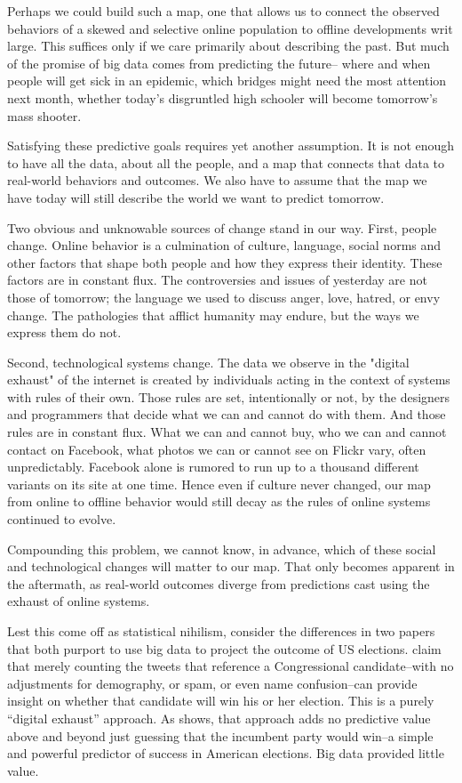 \documentclass[12pt]{article}
\begin{document}
Perhaps we could build such a map, one that allows us to connect the
observed behaviors of a skewed and selective online population to
offline developments writ large. This suffices only if we care
primarily about describing the past. But much of the promise of big
data comes from predicting the future-- where and when people will get
sick in an epidemic, which bridges might need the most attention next
month, whether today's disgruntled high schooler will become
tomorrow's mass shooter.

Satisfying these predictive goals requires yet another assumption. It
is not enough to have all the data, about all the people, and a map
that connects that data to real-world behaviors and outcomes. We also
have to assume that the map we have today will still describe the
world we want to predict tomorrow. 

Two obvious and unknowable sources of change stand in our way. First,
people change. Online behavior is a culmination of culture, language,
social norms and other factors that shape both people and how they
express their identity. These factors are in constant flux. The
controversies and issues of yesterday are not those of tomorrow; the
language we used to discuss anger, love, hatred, or envy change.
The pathologies that afflict humanity may endure, but the ways we
express them do not. 

Second, technological systems change. The data we observe in the
"digital exhaust" of the internet is created by individuals acting in
the context of systems with rules of their own. Those rules are set,
intentionally or not, by the designers and programmers that decide
what we can and cannot do with them. And those rules are in constant
flux. What we can and cannot buy, who we can and cannot contact on
Facebook, what photos we can or cannot see on Flickr vary, often
unpredictably. Facebook alone is rumored to run up to a thousand
different variants on its site at one time. Hence even if culture
never changed, our map from online to offline behavior would still
decay as the rules of online systems continued to evolve.

Compounding this problem, we cannot know, in advance, which of these
social and technological changes will matter to our map. That only
becomes apparent in the aftermath, as real-world outcomes diverge from
predictions cast using the exhaust of online systems.

Lest this come off as statistical nihilism, consider the differences
in two papers that both purport to use big data to project the outcome
of US elections. \cite{digrazia2013} claim that merely counting the
tweets that reference a Congressional candidate--with no adjustments
for demography, or spam, or even name confusion--can provide insight
on whether that candidate will win his or her election. This is a
purely ``digital exhaust'' approach. As \cite{huberty2013twitter}
shows, that approach adds no predictive value
above and beyond just guessing that the incumbent party would win--a
simple and powerful predictor of success in American
elections. Big data provided little value.
\end{document}
